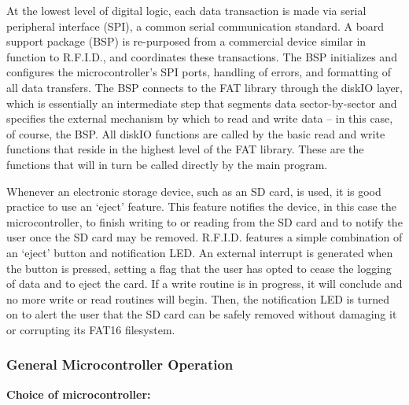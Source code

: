 At the lowest level of digital logic, each data transaction is made via serial peripheral interface (SPI), a common serial communication standard. A board support package (BSP) is re-purposed from a commercial device similar in function to R.F.I.D., and coordinates these transactions. The BSP initializes and configures the microcontroller's SPI ports, handling of errors, and formatting of all data transfers. The BSP connects to the FAT library through the diskIO layer, which is essentially an intermediate step that segments data sector-by-sector and specifies the external mechanism by which to read and write data -- in this case, of course, the BSP. All diskIO functions are called by the basic read and write functions that reside in the highest level of the FAT library. These are the functions that will in turn be called directly by the main program.

Whenever an electronic storage device, such as an SD card, is used, it is good practice to use an `eject' feature. This feature notifies the device, in this case the microcontroller, to finish writing to or reading from the SD card and to notify the user once the SD card may be removed. R.F.I.D. features a simple combination of an `eject' button and notification LED. An external interrupt is generated when the button is pressed, setting a flag that the user has opted to cease the logging of data and to eject the card. If a write routine is in progress, it will conclude and no more write or read routines will begin. Then, the notification LED is turned on to alert the user that the SD card can be safely removed without damaging it or corrupting its FAT16 filesystem.

\subsubsection{General Microcontroller Operation}
\textbf{Choice of microcontroller:}
\DIFaddbegin 

